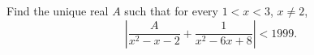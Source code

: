 Find the unique real $A$ such that for every $1<x<3$, $x\ne2$,
\[
\left|\dfrac{A}{x^2-x-2}+\dfrac{1}{x^2-6x+8}\right|<1999.
\]
